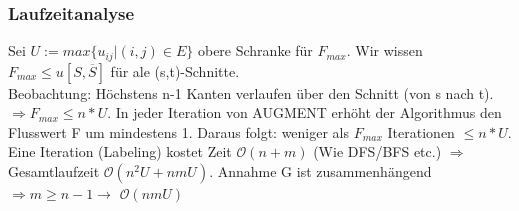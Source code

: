 \documentclass[a4paper]{article}
\newcommand{\oh}[1]{$\mathcal{O}(#1)$}
\begin{document}
\subsubsection*{Laufzeitanalyse}
Sei $U:= max\{u_{ij}| (i,j)\in E\}$ obere Schranke für $F_{max}$. Wir wissen $F_{max}\leq u[S,\overline{S}]$ für ale (s,t)-Schnitte.\\
Beobachtung: Höchstens n-1 Kanten verlaufen über den Schnitt (von s nach t). $\Rightarrow F_{max} \leq n*U$. In jeder Iteration von AUGMENT erhöht der Algorithmus den Flusswert F um mindestens 1. Daraus folgt: weniger als $F_{max}$ Iterationen $\leq n*U$. \\
Eine Iteration (Labeling) kostet Zeit \oh{n+m} (Wie DFS/BFS etc.) $\Rightarrow$ Gesamtlaufzeit \oh{n^2U+nmU}. Annahme G ist zusammenhängend $\Rightarrow m\geq n-1 \rightarrow$ \oh{nmU}
\end{document}
